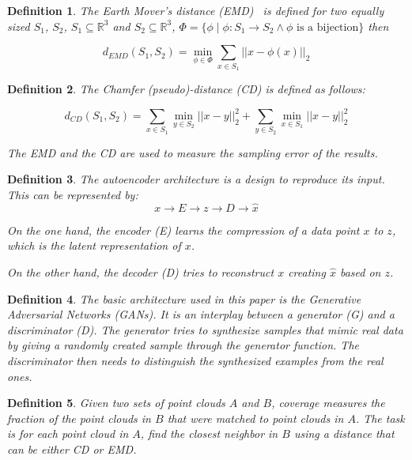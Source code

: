 \documentclass[12pt]{article}
\newtheorem{definition}{Definition}
\begin{document}
    \begin{definition}
        The \emph{Earth Mover's distance (EMD)}~\cite{Rubner2000} is defined for two equally sized $S_{1}$, $S_{2}$, $S_{1} \subseteq \mathbb{R} ^{3}$ and $S_{2} \subseteq \mathbb{R} ^{3}$, $\Phi = \{ \phi \mid \phi: S_{1} \to S_{2} \land \phi \text{ is a bijection}\}$ then

        \[d_{EMD}(S_{1}, S_{2}) = \min _{\phi \in \Phi} \sum_{x \in S_{1}} || x - \phi(x)||_{2}\]
    \end{definition}

    \begin{definition}
        The Chamfer (pseudo)-distance (CD) is defined as follows:

        \[d_{CD}(S_{1}, S_{2}) = \sum_{x \in S_{1}} \min _{y \in S_{2}} || x - y||_{2}^{2} +
        \sum_{y \in S_{2}} \min_{x \in S_{1}} ||x - y||_{2}^{2}\]

        The EMD and the CD are used to measure the sampling error of the results.
    \end{definition}

    \begin{definition}
        The \emph{autoencoder} architecture is a design to reproduce its input.
        This can be represented by:
        \[x \to E \to z \to D \to \hat{x}\]

        On the one hand, the \emph{encoder} (E) learns the compression of a data point $x$ to $z$,
        which is the \emph{latent representation} of $x$.

        On the other hand, the \emph{decoder} (D) tries to reconstruct $x$ creating $\hat{x}$ based on $z$.
    \end{definition}

    \begin{definition}
        The basic architecture used in this paper is the \emph{Generative Adversarial Networks} (GANs).
        It is an interplay between a \emph{generator} (G) and a \emph{discriminator} (D).
        The generator tries to synthesize samples that mimic real data by giving a randomly created sample through the generator function.
        The discriminator then needs to distinguish the synthesized examples from the real ones.
    \end{definition}

    \begin{definition}
        Given two sets of point clouds $A$ and $B$, \emph{coverage} measures the fraction of the point clouds in $B$ that were matched to point clouds in $A$.
        The task is for each point cloud in $A$, find the closest neighbor in $B$ using a distance that can be either CD or EMD.
    \end{definition}
\end{document}
